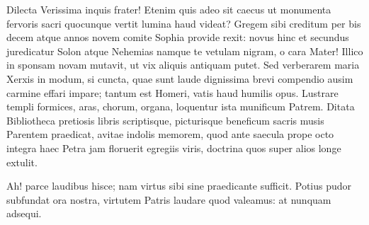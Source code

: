 \documentclass[tocstyle=ref-genre]{ees}
\begin{document}
{\begin{movement}{Dilecta}
  Verissima inquis frater!
  Etenim quis adeo sit caecus
  ut monumenta fervoris sacri
  quocunque vertit lumina haud videat?
  Gregem sibi creditum per bis decem atque annos novem
  comite Sophia provide rexit:
  novus hinc et secundus juredicatur
  Solon atque Nehemias namque
  te vetulam nigram, o cara Mater!
  Illico in sponsam novam mutavit,
  ut vix aliquis antiquam putet.
  Sed verberarem maria Xerxis in modum,
  si cuncta, quae sunt laude dignissima
  brevi compendio ausim carmine effari impare;
  tantum est Homeri, vatis haud humilis opus.
  Lustrare templi formices, aras, chorum,
  organa, loquentur ista munificum Patrem.
  Ditata Bibliotheca pretiosis libris scriptisque,
  picturisque beneficum sacris musis Parentem praedicat,
  avitae indolis memorem,
  quod ante saecula prope octo integra
  haec Petra jam floruerit egregiis viris,
  doctrina quos super alios longe extulit.

  Ah! parce laudibus hisce;
  nam virtus sibi sine praedicante sufficit.
  Potius pudor subfundat ora nostra,
  virtutem Patris laudare quod valeamus:
  at nunquam adsequi.
\end{movement}



}

\eesScore
\end{document}

